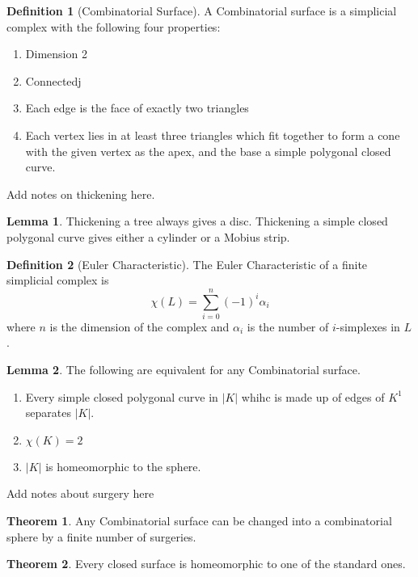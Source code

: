 \documentclass{article}
\theoremstyle{definition}
\newtheorem{definition}{Definition}[section]
\newtheorem{lemma}{Lemma}[section]
\newtheorem{theorem}{Theorem}[section]
\theoremstyle{remark}
\theoremstyle{remark}
\begin{document}
\begin{definition}[Combinatorial Surface]
    A Combinatorial surface is a simplicial complex with the following four properties:
    \begin{enumerate}
        \item Dimension 2
        \item Connectedj
        \item Each edge is the face of exactly two triangles
        \item Each vertex lies in at least three triangles which fit together to form a cone with the given vertex as the apex, and the base a simple polygonal closed curve.
    \end{enumerate}
\end{definition}

Add notes on thickening here.

\begin{lemma}
    Thickening a tree always gives a disc. Thickening a simple closed polygonal curve gives either a cylinder or a Mobius strip.
\end{lemma}

\begin{definition}[Euler Characteristic]
    The Euler Characteristic of a finite simplicial complex is 
    $$ \chi(L) = \sum_{i=0}^n (-1)^i \alpha_{i} $$
    where $n$ is the dimension of the complex and $\alpha_i$ is the number of $i$-simplexes in $L$.
\end{definition}

\begin{lemma}
    The following are equivalent for any Combinatorial surface.
    \begin{enumerate}
        \item Every simple closed polygonal curve in $|K|$ whihc is made up of edges of $K^1$ separates $|K|$.
        \item $\chi(K) = 2$
        \item $|K|$ is homeomorphic to the sphere.
    \end{enumerate}
\end{lemma}

Add notes about surgery here

\begin{theorem}
    Any Combinatorial surface can be changed into a combinatorial sphere by a finite number of surgeries.
\end{theorem}

\begin{theorem}
    Every closed surface is homeomorphic to one of the standard ones.
\end{theorem}
\end{document}
